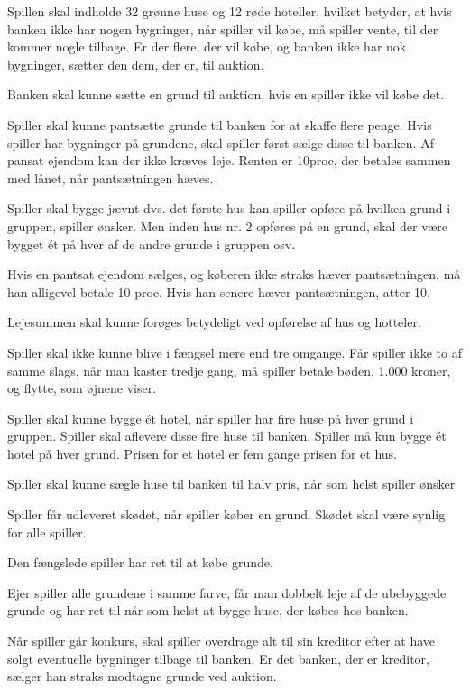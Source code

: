 \documentclass[class=article, crop=false]{standalone}
\newcommand{\reqstart}{
\begin{list}{\thereqcount}{\usecounter{reqcount}}
\setcounter{reqcount}{\value{reqcountbackup}}
}
\newcommand{\reqend}{
\setcounter{reqcountbackup}{\value{reqcount}}
\end{list}
}
\begin{document}
\reqstart
\item Spillen skal indholde 32 grønne huse og 12 røde hoteller, hvilket betyder, at hvis banken ikke har nogen bygninger, når spiller vil købe, må spiller vente, til der kommer nogle tilbage. Er der flere, der vil købe, og banken ikke har nok bygninger, sætter den dem, der er, til auktion.
\item Banken skal kunne sætte en grund til auktion, hvis en spiller ikke vil købe det.
\item Spiller skal kunne pantsætte grunde til banken for at skaffe flere penge. Hvis spiller har bygninger på grundene, skal spiller først sælge disse til banken. Af pansat ejendom kan der ikke kræves leje. Renten er 10proc, der betales sammen med lånet, når pantsætningen hæves.
\item Spiller skal bygge jævnt dvs. det første hus kan spiller opføre på hvilken grund i gruppen, spiller ønsker. Men inden hus nr. 2 opføres på en grund, skal der være bygget ét på hver af de andre grunde i gruppen osv.
\item Hvis en pantsat ejendom sælges, og køberen ikke straks hæver pantsætningen, må
han alligevel betale 10 proc. Hvis han senere hæver pantsætningen, atter 10.
\item Lejesummen skal kunne forøges betydeligt ved opførelse af hus og hotteler.
\item Spiller skal ikke kunne blive i fængsel mere end tre omgange. Får spiller ikke to af samme slags, når man kaster tredje gang, må spiller betale bøden, 1.000 kroner, og flytte, som øjnene viser.
\item Spiller skal kunne bygge ét hotel, når spiller har fire huse på hver grund i gruppen. Spiller skal aflevere disse fire huse til banken. Spiller må kun bygge ét hotel på hver grund. Prisen for et hotel er fem gange prisen for et hus.
\item Spiller skal kunne sægle huse til banken til halv pris, når som helst spiller ønsker
\item Spiller får udleveret skødet, når spiller køber en grund. Skødet skal være synlig for alle spiller.
\item Den fængslede spiller har ret til at købe grunde.
\item Ejer spiller alle grundene i samme farve, får man dobbelt leje af de ubebyggede grunde og har ret til når som helst at bygge huse, der købes hos banken.
\item Når spiller går konkurs, skal spiller overdrage alt til sin kreditor efter at have solgt eventuelle bygninger tilbage til banken. Er det banken, der er kreditor, sælger han straks modtagne grunde ved auktion.
\reqend
\end{document}
